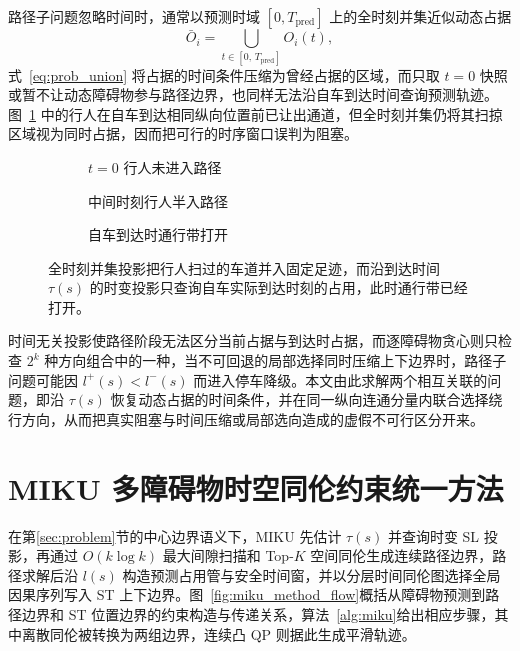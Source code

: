 \documentclass[a4paper,zihao=5]{ctexart}
\theoremstyle{definition}
\begin{document}
路径子问题忽略时间时，通常以预测时域 $[0,T_{\text{pred}}]$ 上的全时刻并集近似动态占据
\begin{equation}
    \bar{O}_i = \bigcup_{t \in [0,\,T_{\text{pred}}]} O_i(t),
    \label{eq:prob_union}
\end{equation}
式~\eqref{eq:prob_union} 将占据的时间条件压缩为曾经占据的区域，而只取 $t{=}0$ 快照或暂不让动态障碍物参与路径边界，也同样无法沿自车到达时间查询预测轨迹。图~\ref{fig:dynamic_exclusion} 中的行人在自车到达相同纵向位置前已让出通道，但全时刻并集仍将其扫掠区域视为同时占据，因而把可行的时序窗口误判为阻塞。

\begin{figure}[htbp]
\centering
\begin{subfigure}[b]{0.30\textwidth}
  \centering
  \caption{$t{=}0$ 行人未进入路径}
\end{subfigure}\hfill
\begin{subfigure}[b]{0.30\textwidth}
  \centering
  \caption{中间时刻行人半入路径}
\end{subfigure}\hfill
\begin{subfigure}[b]{0.30\textwidth}
  \centering
  \caption{自车到达时通行带打开}
\end{subfigure}
\caption{横穿行人场景下的时序约束缺失}
\caption*{全时刻并集投影把行人扫过的车道并入固定足迹，而沿到达时间 $\tau(s)$ 的时变投影只查询自车实际到达时刻的占用，此时通行带已经打开。}
\label{fig:dynamic_exclusion}
\end{figure}

时间无关投影使路径阶段无法区分当前占据与到达时占据，而逐障碍物贪心则只检查 $2^k$ 种方向组合中的一种，当不可回退的局部选择同时压缩上下边界时，路径子问题可能因 $l^{+}(s)<l^{-}(s)$ 而进入停车降级。本文由此求解两个相互关联的问题，即沿 $\tau(s)$ 恢复动态占据的时间条件，并在同一纵向连通分量内联合选择绕行方向，从而把真实阻塞与时间压缩或局部选向造成的虚假不可行区分开来。

\section{MIKU 多障碍物时空同伦约束统一方法}
\label{sec:method}

在第\ref{sec:problem}节的中心边界语义下，MIKU 先估计 $\tau(s)$ 并查询时变 SL 投影，再通过 $O(k\log k)$ 最大间隙扫描和 Top-$K$ 空间同伦生成连续路径边界，路径求解后沿 $l(s)$ 构造预测占用管与安全时间窗，并以分层时间同伦图选择全局因果序列写入 ST 上下边界。图~\ref{fig:miku_method_flow}概括从障碍物预测到路径边界和 ST 位置边界的约束构造与传递关系，算法~\ref{alg:miku}给出相应步骤，其中离散同伦被转换为两组边界，连续凸 QP 则据此生成平滑轨迹。
\end{document}
